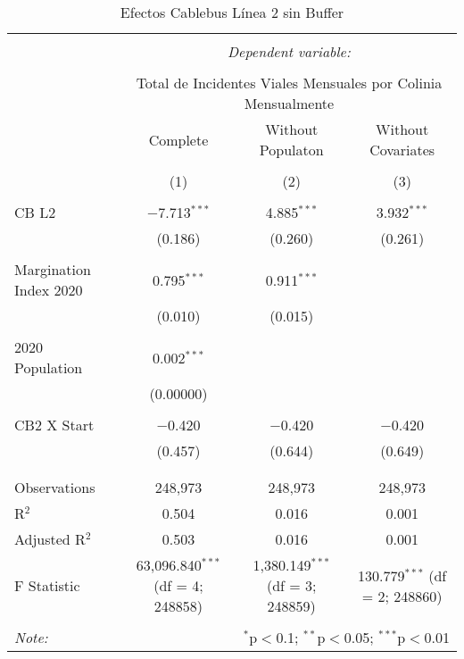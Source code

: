 
\begin{table}[!htbp] \centering 
  \caption{Efectos Cablebus Línea 2 sin Buffer} 
  \label{} 
\begin{tabular}{@{\extracolsep{5pt}}lccc} 
\\[-1.8ex]\hline 
\hline \\[-1.8ex] 
 & \multicolumn{3}{c}{\textit{Dependent variable:}} \\ 
\cline{2-4} 
\\[-1.8ex] & \multicolumn{3}{c}{Total de Incidentes Viales Mensuales por Colinia Mensualmente} \\ 
 & Complete & Without Populaton & Without Covariates \\ 
\\[-1.8ex] & (1) & (2) & (3)\\ 
\hline \\[-1.8ex] 
 CB L2 & $-$7.713$^{***}$ & 4.885$^{***}$ & 3.932$^{***}$ \\ 
  & (0.186) & (0.260) & (0.261) \\ 
  & & & \\ 
 Margination Index 2020 & 0.795$^{***}$ & 0.911$^{***}$ &  \\ 
  & (0.010) & (0.015) &  \\ 
  & & & \\ 
 2020 Population & 0.002$^{***}$ &  &  \\ 
  & (0.00000) &  &  \\ 
  & & & \\ 
 CB2 X Start & $-$0.420 & $-$0.420 & $-$0.420 \\ 
  & (0.457) & (0.644) & (0.649) \\ 
  & & & \\ 
\hline \\[-1.8ex] 
Observations & 248,973 & 248,973 & 248,973 \\ 
R$^{2}$ & 0.504 & 0.016 & 0.001 \\ 
Adjusted R$^{2}$ & 0.503 & 0.016 & 0.001 \\ 
F Statistic & 63,096.840$^{***}$ (df = 4; 248858) & 1,380.149$^{***}$ (df = 3; 248859) & 130.779$^{***}$ (df = 2; 248860) \\ 
\hline 
\hline \\[-1.8ex] 
\textit{Note:}  & \multicolumn{3}{r}{$^{*}$p$<$0.1; $^{**}$p$<$0.05; $^{***}$p$<$0.01} \\ 
\end{tabular} 
\end{table} 
